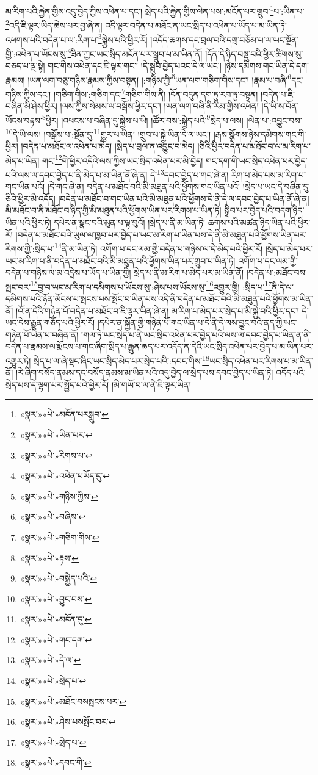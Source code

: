 མ་རིག་པའི་རྐྱེན་གྱིས་འདུ་བྱེད་ཀྱིས་འཕེན་པ་དང་། སྲེད་པའི་རྐྱེན་གྱིས་ལེན་པས་:མངོན་པར་གྲུབ་\footnote{«སྣར་»«པེ་»མངོན་པརསྒྲུབ་}པ་:ཡིན་པ་\footnote{«སྣར་»«པེ་»ཡིན་པར་}འདི་ཇི་ལྟར་ཡིད་ཆེས་པར་བྱ་ཞེ་ན། འདི་ལྟར་བདེན་པ་མཐོང་ན་ཡང་སྲིད་པ་འཕེན་པ་ཡོད་པ་མ་ཡིན་ཏེ། འཕགས་པའི་བདེན་པ་ལ་:རིག་པ་\footnote{«སྣར་»«པེ་»རིགས་པ་}སྐྱེས་པའི་ཕྱིར་རོ། །འདོད་ཆགས་དང་བྲལ་བའི་དགྲ་བཅོམ་པ་ལ་ཡང་སྔོན་གྱི་:འཕེན་པ་ཡོངས་སུ་\footnote{«སྣར་»«པེ་»འཕེན་པཡོད་དུ་}ཟིན་ཀྱང་ཡང་སྲིད་མངོན་པར་སྒྲུབ་པ་མ་ཡིན་ནོ། །དོན་དེ་ཉིད་བསྡུ་བའི་ཕྱིར་ཚིགས་སུ་བཅད་པ་ལྔ་སྟེ། གང་གིས་འཕེན་དང་ཇི་ལྟར་གང་། །དེ་སྒྲུབ་བྱེད་པའང་དེ་ལ་ཡང་། །ཉེས་དམིགས་གང་ཡིན་དེ་དག་རྣམས། །ཡན་ལག་བཅུ་གཉིས་རྣམས་ཀྱིས་བསྟན། །:གཉིས་ཀྱི་\footnote{«སྣར་»«པེ་»གཉིས་ཀྱིས་}ཡན་ལག་གཅིག་གིས་དང་། །རྣམ་པ་བཞི་\footnote{«སྣར་»«པེ་»བཞིས་}དང་གཉིས་ཀྱིས་དང་། །གཅིག་གིས་:གཅིག་དང་\footnote{«སྣར་»«པེ་»གཅིག་གིས་}གཅིག་གིས་ནི། །དོན་བདུན་དག་ཏུ་རབ་ཏུ་བསྟན། །བདེན་པ་ཇི་བཞིན་མི་ཤེས་ཕྱིར། །ལས་ཀྱིས་སེམས་ལ་བསྒོས་ཕྱིར་དང་། །ཡན་ལག་བཞི་ནི་རིམ་གྱིས་འཕེན། །དེ་ཡི་ས་བོན་ཡོངས་བརྟས་\footnote{«སྣར་»«པེ་»རྟས་}ཕྱིར། །འཕངས་པ་བཞིན་དུ་སྐྱེས་པ་ཡི། །ཚོར་བས་:སྐྱེད་པའི་\footnote{«སྣར་»«པེ་»བསྐྱེད་པའི་}སྲེད་པ་ལས། །ལེན་པ་:འབྱུང་བས་\footnote{«སྣར་»«པེ་»བྱུང་བས་}དེ་ཡི་ལས། །བསྒོས་པ་:སྔོན་དུ་\footnote{«སྣར་»«པེ་»མངོན་དུ་}གྱུར་པ་ཡིན། །གྲུབ་པ་སྐྱེ་ཡིན་དེ་ལ་ཡང་། །རྒས་སྩོགས་ཉེས་དམིགས་གང་གི་ཕྱིར། །བདེན་པ་མཐོང་ལ་འཕེན་པ་མེད། །སྲེད་པ་བྲལ་ན་འབྱུང་བ་མེད། །ཅིའི་ཕྱིར་བདེན་པ་མཐོང་བ་ལ་མ་རིག་པ་མེད་པ་ཡིན། གང་\footnote{«སྣར་»«པེ་»གང་དག་}གི་ཕྱིར་འདིའི་ལས་ཀྱིས་ཡང་སྲིད་འཕེན་པར་མི་བྱེད། གང་དག་གི་ཡང་སྲིད་འཕེན་པར་བྱེད་པའི་ལས་ལ་དབང་བྱེད་པ་ནི་མེད་པ་མ་ཡིན་ནོ་ཞེ་ན། དེ་\footnote{«སྣར་»«པེ་»དེ་ལ་}དབང་བྱེད་པ་གང་ཞེ་ན། རིག་པ་མེད་པས་མ་རིག་པ་གང་ཡིན་པའོ། །དེ་གང་ཞེ་ན། བདེན་པ་མཐོང་བའི་མི་མཐུན་པའི་ཕྱོགས་གང་ཡིན་པའོ། །སྲེད་པ་ཡང་དེ་བཞིན་དུ་ཅིའི་ཕྱིར་མི་འདོད། །བདེན་པ་མཐོང་བ་གང་ཡིན་པའི་མི་མཐུན་པའི་ཕྱོགས་དེ་ནི་དེ་ལ་དབང་བྱེད་པ་ཡིན་ནོ་ཞེ་ན། མི་མཐོང་བ་ནི་མཐོང་བ་ཉིད་ཀྱི་མི་མཐུན་པའི་ཕྱོགས་ཡིན་པར་རིགས་པ་ཡིན་ཏེ། སྒྲིབ་པར་བྱེད་པའི་བདག་ཉིད་ཡིན་པའི་ཕྱིར་ཏེ། དཔེར་ན་སྣང་བའི་མུན་པ་ལྟ་བུའོ། །སྲེད་པ་ནི་མ་ཡིན་ཏེ། ཆགས་པའི་མཚན་ཉིད་ཡིན་པའི་ཕྱིར་རོ། །བདེན་པ་མཐོང་བའི་ཡུལ་ལ་ཁྱབ་པར་བྱེད་པ་ཡང་མ་རིག་པ་ཡིན་པས་དེ་ནི་མི་མཐུན་པའི་ཕྱོགས་ཡིན་པར་རིགས་ཀྱི་:སྲིད་པ་\footnote{«སྣར་»«པེ་»སྲེད་པ་}ནི་མ་ཡིན་ཏེ། འགོག་པ་དང་ལམ་གྱི་བདེན་པ་གཉིས་ལ་དེ་མེད་པའི་ཕྱིར་རོ། །སྲེད་པ་མེད་པར་ཡང་མ་རིག་པ་ནི་བདེན་པ་མཐོང་བའི་མི་མཐུན་པའི་ཕྱོགས་ཡིན་པར་གྲུབ་པ་ཡིན་ཏེ། འགོག་པ་དང་ལམ་གྱི་བདེན་པ་གཉིས་ལ་མ་འདྲེས་པ་ཡོད་པ་ཡིན་གྱི། སྲེད་པ་ནི་མ་རིག་པ་མེད་པར་མ་ཡིན་ནོ། །བདེན་པ་:མཐོང་བས་སྤང་བར་\footnote{«སྣར་»«པེ་»མཐོང་བསསྤངས་པར་}བྱ་བ་ཡང་མ་རིག་པ་དམིགས་པ་ཡོངས་སུ་:ཤེས་པས་ཡོངས་སུ་\footnote{«སྣར་»«པེ་»ཤེས་པསསྤོང་བར་}འགྱུར་གྱི། :སྲིད་པ་\footnote{«སྣར་»«པེ་»སྲེད་པ་}ནི་དེ་ལ་དམིགས་པའི་ཉོན་མོངས་པ་སྤངས་པས་སྤོང་བ་ཡིན་པས་འདི་ནི་བདེན་པ་མཐོང་བའི་མི་མཐུན་པའི་ཕྱོགས་མ་ཡིན་ནོ། །འོ་ན་དེའི་གཉེན་པོ་བདེན་པ་མཐོང་བ་ཇི་ལྟར་ཡིན་ཞེ་ན། མ་རིག་པ་མེད་པར་སྲེད་པ་མི་སྐྱེ་བའི་ཕྱིར་དང་། དེ་ཡང་དེས་རྒྱུན་གཅོད་པའི་ཕྱིར་རོ། །དཔེར་ན་སྐྱོན་གྱི་གཉེན་པོ་གང་ཡིན་པ་དེ་ནི་དེ་ལས་བྱུང་བའི་ནད་ཀྱི་ཡང་གཉེན་པོ་ཡིན་པ་བཞིན་ནོ། །གལ་ཏེ་ཡང་སྲེད་པ་ནི་ཡང་སྲིད་འཕེན་པར་བྱེད་པའི་ལས་ལ་དབང་བྱེད་པ་ཡིན་ན་ནི་བདེན་པ་རྣམས་ལ་རྨོངས་པ་གང་ཞིག་སྲིད་པ་རྒྱུན་ཆད་པར་འདོད་ན་དེའི་ཡང་སྲིད་འཕེན་པར་བྱེད་པ་མ་ཡིན་པར་འགྱུར་ཏེ། སྲེད་པ་ལ་ཞེ་སྡང་ཞིང་ཡང་སྲིད་མེད་པར་སྲེད་པའི་:དབང་གིས་\footnote{«སྣར་»«པེ་»དབང་གི་}ཡང་སྲིད་འཕེན་པར་རིགས་པ་མ་ཡིན་ནོ། །རེ་ཞིག་བསོད་ནམས་དང་བསོད་ནམས་མ་ཡིན་པའི་འདུ་བྱེད་ལ་སྲེད་པས་དབང་བྱེད་པ་ཡིན་ཏེ། འདོད་པའི་སྲེད་པས་དེ་ལྷག་པར་སྤྱོད་པའི་ཕྱིར་རོ། །མི་གཡོ་བ་ལ་ནི་ཇི་ལྟར་ཡིན། 